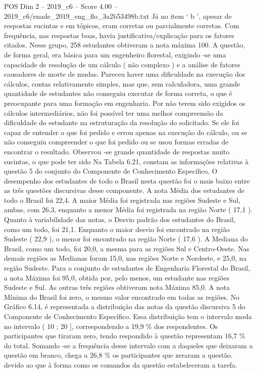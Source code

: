 \begin{textsample}{POS Dim 2 – 2019\_c6 – Score 4.00 – 2019\_c6/enade\_2019\_eng\_flo\_3a2b53498b.txt}
Já no item ‘ b ’, apesar de respostas sucintas e em tópicos, eram corretas ou parcialmente corretas.
Com frequência, nas respostas boas, havia justificativa/explicação para os fatores citados.
Nesse grupo, 258 estudantes obtiveram a nota máxima 100.
A questão, de forma geral, era básica para um engenheiro florestal, exigindo -se uma capacidade de resolução de um cálculo ( não complexo ) e a análise de fatores causadores de morte de mudas.
Pareceu haver uma dificuldade na execução dos cálculos, contas relativamente simples, mas que, sem calculadora, uma grande quantidade de estudantes não conseguiu executar de forma correta, o que é preocupante para uma formação em engenharia.
Por não terem sido exigidos os cálculos intermediários, não foi possível ter uma melhor compreensão da dificuldade do estudante na estruturação da resolução do solicitado.
Se ele foi capaz de entender o que foi pedido e errou apenas na execução do cálculo, ou se não conseguiu compreender o que foi pedido ou se usou formas erradas de encontrar o resultado.
Observou -se grande quantidade de respostas muito sucintas, o que pode ter sido Na Tabela 6.21, constam as informações relativas à questão 5 do conjunto do Componente de Conhecimento Específico.
O desempenho dos estudantes de todo o Brasil nesta questão foi o mais baixo entre as três questões discursivas desse componente.
A nota Média dos estudantes de todo o Brasil foi 22,4.
A maior Média foi registrada nas regiões Sudeste e Sul, ambas, com 26,3, enquanto a menor Média foi registrada na região Norte ( 17,1 ).
Quanto à variabilidade das notas, o Desvio padrão dos estudantes do Brasil, como um todo, foi 21,1.
Enquanto o maior desvio foi encontrado na região Sudeste ( 22,9 ), o menor foi encontrado na região Norte ( 17,6 ).
A Mediana do Brasil, como um todo, foi 20,0, a mesma para as regiões Sul e Centro-Oeste.
Nas demais regiões as Medianas foram 15,0, nas regiões Norte e Nordeste, e 25,0, na região Sudeste.
Para o conjunto de estudantes de Engenharia Florestal do Brasil, a nota Máxima foi 95,0, obtida por, pelo menos, um estudante nas regiões Sudeste e Sul.
As outras três regiões obtiveram nota Máxima 85,0.
A nota Mínima do Brasil foi zero, o mesmo valor encontrado em todas as regiões.
No Gráfico 6.14, é representada a distribuição das notas da questão discursiva 5 do Componente de Conhecimento Específico.
Essa distribuição tem o intervalo moda no intervalo ( 10 ; 20 ], correspondendo a 19,9 \% dos respondentes.
Os participantes que tiraram zero, tendo respondido à questão representam 16,7 \% do total.
Somando -se a frequência desse intervalo com a daqueles que deixaram a questão em branco, chega a 26,8 \% os participantes que zeraram a questão. devido ao que à forma como os comandos da questão estabeleceram a tarefa.

\end{textsample}
